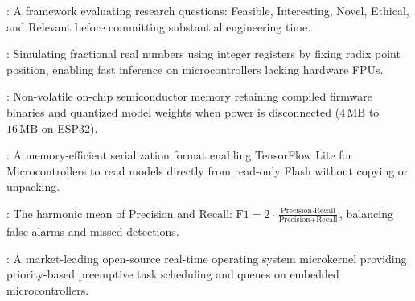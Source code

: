 \begin{description}[leftmargin=!,labelwidth=4.5cm,itemsep=1.5ex]
\item[\textbf{FINER Criteria}\hfill \textnormal{\sffamily\scriptsize\color{keyideablue}[Research]}]: A framework evaluating research questions: Feasible, Interesting, Novel, Ethical, and Relevant before committing substantial engineering time.
\item[\textbf{Fixed-Point Arithmetic}\hfill \textnormal{\sffamily\scriptsize\color{keyideablue}[TinyML]}]: Simulating fractional real numbers using integer registers by fixing radix point position, enabling fast inference on microcontrollers lacking hardware FPUs.
\item[\textbf{Flash Memory (ROM)}\hfill \textnormal{\sffamily\scriptsize\color{keyideablue}[IoT \& Hardware]}]: Non-volatile on-chip semiconductor memory retaining compiled firmware binaries and quantized model weights when power is disconnected ($4\,\text{MB}$ to $16\,\text{MB}$ on ESP32).
\item[\textbf{FlatBuffers}\hfill \textnormal{\sffamily\scriptsize\color{keyideablue}[TinyML Tools]}]: A memory-efficient serialization format enabling TensorFlow Lite for Microcontrollers to read models directly from read-only Flash without copying or unpacking.
\item[\textbf{F1 Score}\hfill \textnormal{\sffamily\scriptsize\color{keyideablue}[Evaluation]}]: The harmonic mean of Precision and Recall: $\text{F1} = 2 \cdot \frac{\text{Precision} \cdot \text{Recall}}{\text{Precision} + \text{Recall}}$, balancing false alarms and missed detections.
\item[\textbf{FreeRTOS}\hfill \textnormal{\sffamily\scriptsize\color{keyideablue}[IoT \& Hardware]}]: A market-leading open-source real-time operating system microkernel providing priority-based preemptive task scheduling and queues on embedded microcontrollers.
\end{description}

